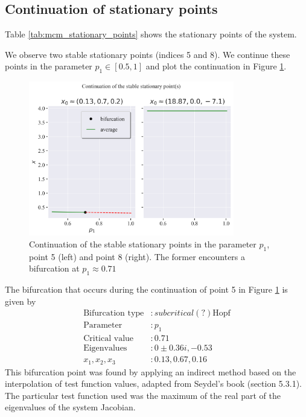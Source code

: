 \subsection{Continuation of stationary points}
Table \ref{tab:mcm_stationary_points} shows the stationary points of the system. 


We observe two stable stationary points (indices 5 and 8). We continue these
points in the parameter $ p_1 \in [0.5, 1] $ and plot the continuation in Figure \ref{fig:mcm_continuation}.
\begin{figure}[H]
    \centering
    \includegraphics[width=0.8\textwidth]{figures/mcm_continuation.png}
    \caption{Continuation of the stable stationary points in the parameter $p_1$,
    point 5 (left) and point 8 (right). The former encounters a bifurcation at $p_1 \approx 0.71$}
    \label{fig:mcm_continuation}
\end{figure}

The bifurcation that occurs during the continuation of point 5 in Figure \ref{fig:mcm_continuation} is given by
\begin{align*}
    \text{Bifurcation type} & : subcritical(?) \text{Hopf} \\
    \text{Parameter} & : p_1 \\
    \text{Critical value} & : 0.71 \\
    \text{Eigenvalues} & : 0 \pm 0.36i, -0.53\\
    x_1, x_2, x_3 & : 0.13, 0.67, 0.16
\end{align*}
This bifurcation point was found by applying an indirect method based on the interpolation of test function values, adapted from 
Seydel's book (section 5.3.1). The particular test function used was the maximum of the real part of the eigenvalues of
the system Jacobian.

